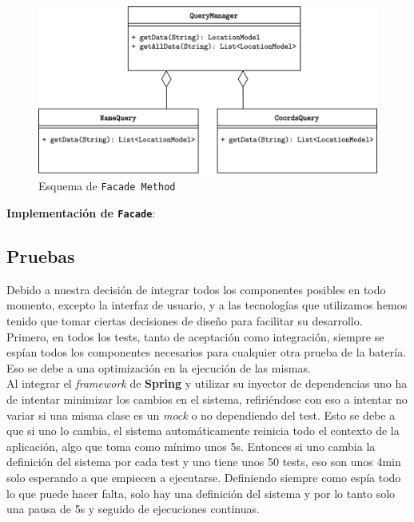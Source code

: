 \documentclass[../ei103948-project-documentation.tex]{subfiles}
\begin{document}
                        \begin{figure}[H]
                            \begin{center}
                            \includegraphics[scale=0.16]{images/FacadeMethod.png}
                            \end{center}
                            \caption{Esquema de \texttt{Facade Method}}
                        \end{figure}
            
            
                        \textbf{Implementación de \texttt{Facade}}:
                        
                        


                        \subsection{Pruebas}

                        Debido a nuestra decisión de integrar todos los componentes posibles en todo momento, excepto la interfaz de usuario, y a las tecnologías que utilizamos hemos tenido que tomar ciertas decisiones de diseño para facilitar su desarrollo.\\
                        
                        Primero, en todos los tests, tanto de aceptación como integración, siempre se espían todos los componentes necesarios para cualquier otra prueba de la batería. Eso se debe a una optimización en la ejecución de las mismas.\\
                        
                        Al integrar el \textit{framework} de \textbf{Spring} y utilizar su inyector de dependencias uno ha de intentar minimizar los cambios en el sistema, refiriéndose con eso a intentar no variar si una misma clase es un \textit{mock} o no dependiendo del test. Esto se debe a que si uno lo cambia, el sistema automáticamente reinicia todo el contexto de la aplicación, algo que toma como mínimo unos 5s. Entonces si uno cambia la definición del sistema por cada test y uno tiene unos 50 tests, eso son unos 4min solo esperando a que empiecen a ejecutarse. Definiendo siempre como espía todo lo que puede hacer falta, solo hay una definición del sistema y por lo tanto solo una pausa de 5s y seguido de ejecuciones continuas.\\
                        
\end{document}
